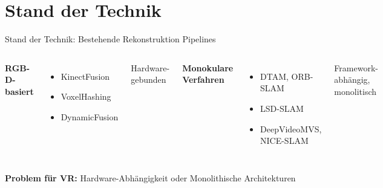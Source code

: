 \section{Stand der Technik}\sectionFrame

\begin{frame}{Stand der Technik: Bestehende Rekonstruktion Pipelines}{\small \cite{7a99ce8940e943c39152b8da3bdfb568, kinectfusion, niessner2013hashing, dynamicfusion, dtam,zhu2022niceslamneuralimplicitscalable}}
    \begin{columns}[T]
        \textbf{\large RGB-D-basiert}
        \begin{itemize}
            \item KinectFusion
            \item VoxelHashing
            \item DynamicFusion
        \end{itemize}
        \vspace{0.3cm}
        {\small \color{gray} Hardware-gebunden}
        
        \textbf{\large Monokulare Verfahren}
        \begin{itemize}
            \item DTAM, ORB-SLAM
            \item LSD-SLAM
            \item DeepVideoMVS, NICE-SLAM
        \end{itemize}
        \vspace{0.3cm}
        {\small \color{gray} Framework-abhängig, monolitisch}
    \end{columns}
    
    \vspace{0.8cm}
    \begin{tcolorbox}[box5, boxsep=0.5em]
        \centering
        \textbf{Problem für VR:} Hardware-Abhängigkeit oder Monolithische Architekturen
    \end{tcolorbox}
\end{frame}

    
    
